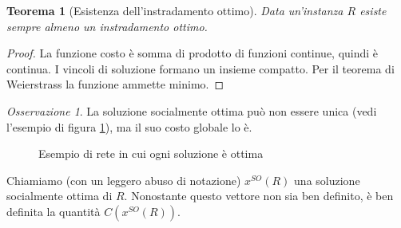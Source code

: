 \documentclass[a4paper]{article}
\newcounter{counter1}
\theoremstyle{plain}
\newtheorem{myteo}[counter1]{Teorema}
\theoremstyle{definition}
\theoremstyle{remark}
\newtheorem{myoss}[counter1]{Osservazione}
\newcommand{\pa}[1]{\left(#1\right)}
\begin{document}
\begin{myteo}[Esistenza dell'instradamento ottimo]
  Data un'instanza $R$ esiste sempre almeno un instradamento ottimo.
\end{myteo}
\begin{proof}
  La funzione costo \`e somma di prodotto di funzioni continue, quindi
  \`e continua. I vincoli di soluzione formano un insieme
  compatto. Per il teorema di Weierstrass la funzione ammette minimo.
\end{proof}
\begin{myoss}
  La soluzione socialmente ottima pu\`o non essere unica (vedi
  l'esempio di figura \ref{fig:esempio-so-nonunica}), ma il suo costo
  globale lo \`e.
\end{myoss}
\begin{figure}[ht]
  \centering
  \caption{Esempio di rete in cui ogni soluzione \`e ottima}
  \label{fig:esempio-so-nonunica}
\end{figure}

Chiamiamo (con un leggero abuso di notazione) $x^{SO}\pa{R}$ una
soluzione socialmente ottima di $R$. Nonostante questo vettore non sia
ben definito, \`e ben definita la quantit\`a $C\pa{x^{SO}\pa{R}}$.
\end{document}

